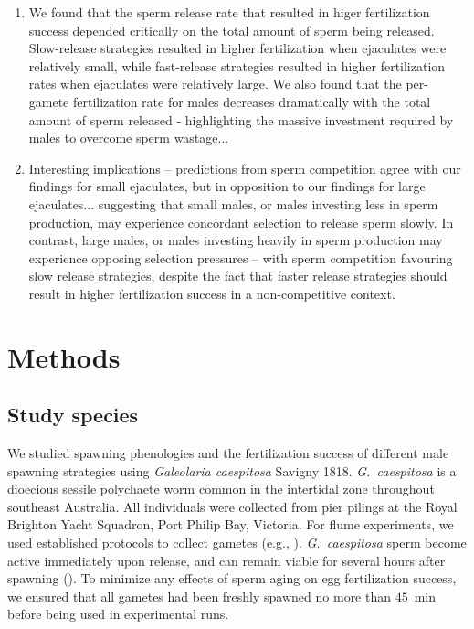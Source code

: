 \documentclass{article}
\begin{document}
\begin{enumerate}
\begin{enumerate}
			\item We found that the sperm release rate that resulted in higer fertilization success depended critically on the total amount of sperm being released. Slow-release strategies resulted in higher fertilization when ejaculates were relatively small, while fast-release strategies resulted in higher fertilization rates when ejaculates were relatively large. We also found that the per-gamete fertilization rate for males decreases dramatically with the total amount of sperm released - highlighting the massive investment required by males to overcome sperm wastage... 
			\item Interesting implications -- predictions from sperm competition agree with our findings for small ejaculates, but in opposition to our findings for large ejaculates... suggesting that small males, or males investing less in sperm production, may experience concordant selection to release sperm slowly. In contrast, large males, or males investing heavily in sperm production may experience opposing selection pressures -- with sperm competition favouring slow release strategies, despite the fact that faster release strategies should result in higher fertilization success in a non-competitive context.
		\end{enumerate}

\end{enumerate}



\section*{Methods}

	\subsection*{Study species}
	We studied spawning phenologies and the fertilization success of different male spawning strategies using \textit{Galeolaria caespitosa} Savigny 1818. \textit{G.~caespitosa} is a dioecious sessile polychaete worm common in the intertidal zone throughout southeast Australia. All individuals were collected from pier pilings at the Royal Brighton Yacht Squadron, Port Philip Bay, Victoria. For flume experiments, we used established protocols to collect gametes (e.g., \citealt{MarshallEvans2005a, MarshallEvans2005b}). \textit{G.~caespitosa} sperm become active immediately upon release, and can remain viable for several hours after spawning (\citealt{Kupriyanova2013}). To minimize any effects of sperm aging on egg fertilization success, we ensured that all gametes had been freshly spawned no more than $45$~min before being used in experimental runs.
\end{document}
